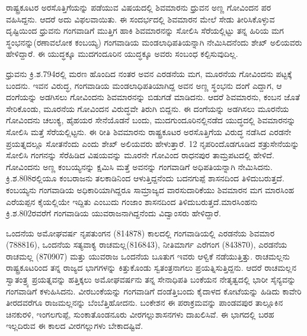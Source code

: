 ರಾಷ್ಟ್ರಕೂಟರ ಅರಸೊತ್ತಿಗೆಯನ್ನು ಪಡೆಯುವ ವಿಷಯದಲ್ಲಿ ಶಿವಮಾರನು ಧ್ರುವನ ಅಣ್ಣ ಗೋವಿಂದನ ಪರ ವಹಿಸಿದ್ದನು. ಆದರೆ ಅದು ವಿಫಲವಾಯಿತು. ಈ ಸಂದರ್ಭದಲ್ಲಿ ಶಿವಮಾರನ ಮೇಲೆ ಸೇಡು ತೀರಿಸಿಕೊಳ್ಳುವ ದೃಷ್ಟಿಯಿಂದ ಧ್ರುವನು ಗಂಗವಾಡಿಗೆ ಮುತ್ತಿಗ ಹಾಕಿ ಶಿವಮಾರನನ್ನು ಸೋಲಿಸಿ ಸೆರೆಯಲ್ಲಿಟ್ಟು ತನ್ನ ಹಿರಿಯ ಮಗ ಸ್ಥಂಭನನ್ನು\break (ರಣಾವಲೋಕ ಕಂಬಯ್ಯ) ಗಂಗವಾಡಿಯ ಮಂಡಲಾಧಿಪತಿಯನ್ನಾಗಿ ನೇಮಿಸಿದನೆಂದು ಶೇಖ್​ ಅಲಿಯವರು ಹೇಳಿದ್ದಾರೆ. ಈ ಯುದ್ಧಕ್ಕೂ ಮುದಗಂದೂರಿನ ಯುದ್ಧಕ್ಕೂ ಅವರು ಸಂಬಂಧ ಕಲ್ಪಿಸುವುದಿಲ್ಲ.

ಧ್ರುವನು ಕ್ರಿ.ಶ.794ರಲ್ಲಿ ಮರಣ ಹೊಂದಿದ ನಂತರ ಅವನ ಎರಡನೆಯ ಮಗ, ಮೂರನೆಯ ಗೋವಿಂದನು ಪಟ್ಟಕ್ಕೆ ಬಂದನು. ಇವನ ವಿರುದ್ಧ, ಗಂಗವಾಡಿಯ ಮಂಡಲಾಧಿಪತಿಯಾಗಿದ್ದ ಅವನ ಅಣ್ಣ ಸ್ಥಂಭನು ದಂಗೆ ಎದ್ದಾಗ, ಆ ದಂಗೆಯನ್ನು ಅಡಗಿಸಲು ಗೋವಿಂದನು ಶಿವಮಾರನನ್ನು ಬಿಡುಗಡೆ ಮಾಡಿದನು. ಆದರೆ ಶಿವಮಾರನು, ಕಂಬನ ಜೊತೆ ಸೇರಿಕೊಂಡು, ಮೂರನೆಯ ಗೋವಿಂದನ ವಿರುದ್ಧವೇ ತಿರುಗಿ ಬಿದ್ದನು. ಈ ದಂಗೆಯನ್ನು ಅಡಗಿಸಲು ಮೂರನೆಯ ಗೋವಿಂದನು ಚಲುಕ್ಯ, ಹೈಹಯರ ಸೇನೆಯೊಡನೆ ಬಂದು, ಮುದಗುಂದೂರಿನಲ್ಲಿನಡೆದ ಯುದ್ಧದಲ್ಲಿ ಶಿವಮಾರನನ್ನು ಸೋಲಿಸಿ ಮತ್ತೆ ಸೆರೆಯಲ್ಲಿಟ್ಟನು. ಈ ರೀತಿ ಶಿವಮಾರನು ರಾಷ್ಟ್ರಕೂಟರ ಅರಸೊತ್ತಿಗೆಯ ವಿರುದ್ಧ ನಡೆಸಿದ ಎರಡನೇ ಪ್ರಯತ್ನದಲ್ಲೂ ಸೋತನೆಂದು ಎಂದು ಶೇಖ್​ ಅಲಿಯವರು ಹೇಳುತ್ತಾರೆ. 12 ನೃಪರಿಂದೊಡಗೂಡಿದ ಶತ್ರುಸೇನೆಯನ್ನು ಸೋಲಿಸಿ ಗಂಗನನ್ನು ಸೆರೆಹಿಡಿದ ವಿಷಯವನ್ನು ಮೂರನೇ ಗೋವಿಂದ ರಾಧನಪುರ ತಾಮ್ರಪಟದಲ್ಲಿ ಹೇಳಿದೆ. ಗೋವಿಂದನು ಅಣ್ಣ ಕಂಬಯ್ಯನನ್ನು ಕ್ಷಮಿಸಿ ಮತ್ತೆ ಅವನನ್ನು ಗಂಗವಾಡಿಗೆ ಅಧಿಪತಿಯನ್ನಾಗಿ ನೇಮಿಸಿದನು. ಕ್ರಿ.ಶ.808ರಲ್ಲಿಯೂ ಕಂಬರಾಜನು ತಲಕಾಡಿನಿಂದ ಆಳುತ್ತಿದ್ದನೆಂದು ಬದನಗುಪ್ಪೆ ಶಾಸನದಿಂದ ತಿಳಿದುಬರುತ್ತದೆ. ಕಂಬಯ್ಯನು ಗಂಗವಾಡಿಯ ಅಧಿಕಾರಿಯಾಗಿದ್ದರೂ ಸಾಮ್ರಾಜ್ಯದ ವಾರಸುದಾರಿಕೆಯು ಶಿವಮಾರನ ಮಗ ಮಾರಸಿಂಹ ಎರೆಯಪ್ಪನ ಕೈಯಲ್ಲಿಯೇ ಇದ್ದಿತು ಎಂಬುದು ಗಂಜಾಂ ಶಾಸನದಿಂದ ತಿಳಿದುಬರುತ್ತದೆ.ಮಾರಸಿಂಹನು ಕ್ರಿ.ಶ.802ರವರೆಗೆ ಗಂಗವಾಡಿಯ ಯುವರಾಜನಾಗಿದ್ದನೆಂದು ವಿದ್ವಾಂಸರು ಹೇಳಿದ್ದಾರೆ.

ಒಂದನೆಯ ಅಮೋಘವರ್ಷ ನೃಪತುಂಗನ (814\enginline{-}878) ಕಾಲದಲ್ಲಿ ಗಂಗವಾಡಿಯಲ್ಲಿ ಎರಡನೆಯ ಶಿವಮಾರ (788\enginline{-}816), ಒಂದನೆಯ ಸತ್ಯವಾಕ್ಯ ರಾಚಮಲ್ಲ(816\enginline{-}843), ನೀತಿಮಾರ್ಗ ಎರೆಗಂಗ (843\enginline{-}870), ಎರಡನೆಯ ರಾಚಮಲ್ಲ (870\enginline{-}907) ಮತ್ತು ಯುವರಾಜ ಒಂದನೆಯ ಬೂತುಗ ಇವರು ಆಳ್ವಿಕೆ ನಡೆಯುತ್ತಿತ್ತು. ರಾಚಮಲ್ಲನು ರಾಷ್ಟ್ರಕೂಟರಿಂದ ತನ್ನ ರಾಜ್ಯದ ಭಾಗಗಳನ್ನು ಕಿತ್ತುಕೊಂಡು ಸ್ವತಂತ್ರನಾಗಲು ಪ್ರಯತ್ನಿಸುತ್ತಿದ್ದನು. ಆದರೆ ರಾಚಮಲ್ಲನ ಸ್ವಾತಂತ್ರ್ಯ ಪ್ರಯತ್ನವನ್ನು ಹತ್ತಿಕ್ಕಲು ಅಮೋಘವರ್ಷನು ತನ್ನ ಸೇನಾಧಿಪತಿ ಬಂಕೆಯನ ನೇತೃತ್ವದಲ್ಲಿ ಭಾರೀ ಸೈನ್ಯವನ್ನು ಗಂಗವಾಡಿಗೆ ಕಳುಹಿಸಿದನು. ವೀರಬಂಕೆಯನ್ನು ಗಂಗವಾಡಿಗೆ ದಂಡೆತ್ತಿಬಂದು ಕೈದಾಳದ ಕೋಟೆಯನ್ನು ಹಿಡಿದು ಕಾವೇರಿ ತೀರದವರೆಗೂ ರಾಜಮಲ್ಲನನ್ನು ಬೆಂಬೆತ್ತಿಹೋದನು. ಬಂಕೇಶನ ಈ ಪರಾಕ್ರಮವನ್ನು ಪಾಂಡವಪುರ ತಾಲ್ಲೂಕಿನ ಚಿನಕುರಳಿ, ಇಂಗಲಗುಪ್ಪೆ, ಸುಂಕಾತೊಂಡನೂರು ವೀರಗಲ್ಲುಶಾಸನಗಳು ದಾಖಲಿಸಿವೆ. ಈ ಭಾಗದಲ್ಲಿ ಬರಹ ಇಲ್ಲದಿರುವ ಈ ಕಾಲದ ವೀರಗಲ್ಲುಗಳು ಬೇಕಾದಷ್ಟಿವೆ.

